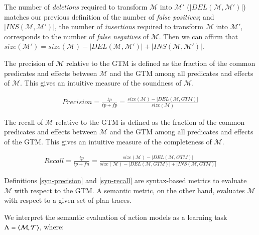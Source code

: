 The number of \emph{deletions} required to transform $\mathcal{M}$ into $\mathcal{M'}$ ($\left|DEL(\mathcal{M},\mathcal{M'})\right|$) matches our previous definition of the number of {\em false positives}; and $\left|INS(\mathcal{M},\mathcal{M'})\right|$, the number of \emph{insertions} required to transform $\mathcal{M}$ into $\mathcal{M'}$, corresponds to the number of {\em false negatives} of $\mathcal{M}$. Then we can affirm that $size(\mathcal{M'}) = size(\mathcal{M}) - \left|DEL(\mathcal{M},\mathcal{M'})\right| + \left|INS(\mathcal{M},\mathcal{M'})\right|$.

\begin{mydefinition} \label{syn-precision} The precision of $\mathcal{M}$ relative to the GTM is defined as the fraction of the common predicates and effects between $\mathcal{M}$ and the GTM among all predicates and effects of $\mathcal{M}$. This gives an intuitive measure of the soundness of $\mathcal{M}$.
\begin{small}
	\begin{align*}
     Precision=\frac{tp}{tp+fp}=\frac{size(\mathcal{M})- \left|DEL(\mathcal{M},GTM)\right|}{size(\mathcal{M})}
	\end{align*}
\end{small}
\end{mydefinition}



\begin{mydefinition} \label{syn-recall} The recall of $\mathcal{M}$ relative to the GTM is defined as the fraction of the common predicates and effects between $\mathcal{M}$ and the GTM among all predicates and effects of the GTM. This gives an intuitive measure of the completeness of $\mathcal{M}$.

\begin{small}
	\begin{align*}
     Recall= \frac{tp}{tp+fn}=
\frac{size(\mathcal{M})- \left|DEL(\mathcal{M},GTM)\right|}{size(\mathcal{M}) - \left|DEL(\mathcal{M},GTM)\right| + \left|INS(\mathcal{M},GTM)\right|}
	\end{align*}
\end{small}
\end{mydefinition}


Definitions \ref{syn-precision} and \ref{syn-recall} are syntax-based metrics to evaluate $\mathcal{M}$ with respect to the GTM. A semantic metric, on the other hand, evaluates $\mathcal{M}$ with respect to a given set of plan traces.

We interpret the semantic evaluation of action models as a learning task $\Lambda = {\langle \mathcal{M}, \mathcal{T} \rangle}$, where:

